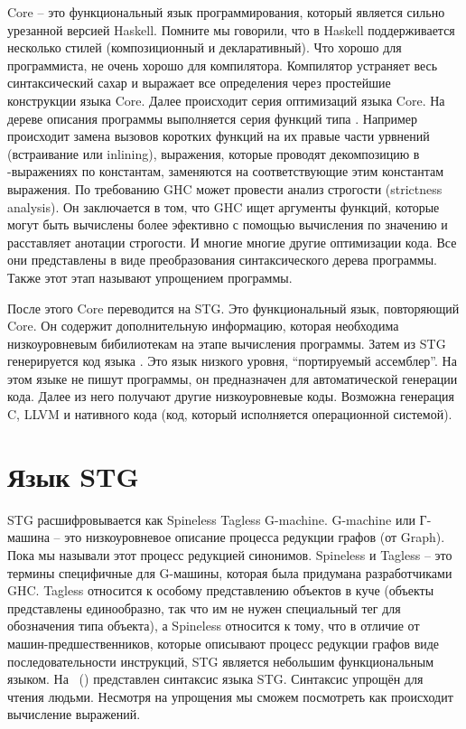 Core -- это функциональный язык программирования, который является
сильно урезанной версией Haskell. Помните мы говорили, что в Haskell
поддерживается несколько стилей (композиционный и декларативный). Что
хорошо для программиста, не очень хорошо для компилятора. Компилятор
устраняет весь синтаксический сахар и выражает все определения через
простейшие конструкции языка Core. Далее происходит серия оптимизаций
языка Core. На дереве описания программы выполняется серия функций типа
. Например происходит замена вызовов коротких функций
на их правые части урвнений (встраивание или inlining), выражения,
которые проводят декомпозицию в -выражениях по константам,
заменяются на соответствующие этим константам выражения. По требованию
GHC может провести анализ строгости (strictness analysis). Он
заключается в том, что GHC ищет аргументы функций, которые могут быть
вычислены более эфективно с помощью вычисления по значению и расставляет
анотации строгости. И многие многие другие оптимизации кода. Все они
представлены в виде преобразования синтаксического дерева программы.
Также этот этап называют упрощением программы.

После этого Core переводится на STG. Это функциональный язык,
повторяющий Core. Он содержит дополнительную информацию, которая
необходима низкоуровневым бибилиотекам на этапе вычисления программы.
Затем из STG генерируется код языка . Это язык низкого уровня,
``портируемый ассемблер''. На этом языке не пишут программы, он
предназначен для автоматической генерации кода. Далее из него получают
другие низкоуровневые коды. Возможна генерация C, LLVM и нативного кода
(код, который исполняется операционной системой).

\section{Язык STG}

STG расшифровывается как Spineless Tagless G-machine. G-machine или
Г-машина -- это низкоуровневое описание процесса редукции графов (от
Graph). Пока мы называли этот процесс редукцией синонимов. Spineless и
Tagless -- это термины специфичные для G-машины, которая была придумана
разработчиками GHC. Tagless относится к особому представлению объектов в
куче (объекты представлены единообразно, так что им не нужен специальный
тег для обозначения типа объекта), а Spineless относится к тому, что в
отличие от машин-предшественников, которые описывают процесс редукции
графов виде последовательности инструкций, STG является небольшим
функциональным языком. На ~() представлен синтаксис
языка STG. Синтаксис упрощён для чтения людьми. Несмотря на упрощения мы
сможем посмотреть как происходит вычисление выражений.

